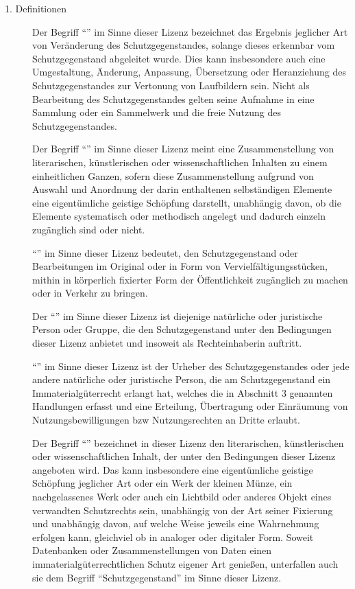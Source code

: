 \begin{description}
\item[1. Definitionen] Der Begriff
  \enquote{} im Sinne dieser Lizenz
  bezeichnet das Ergebnis jeglicher Art von Veränderung
  des Schutzgegenstandes, solange dieses erkennbar vom
  Schutzgegenstand abgeleitet wurde. Dies kann
  insbesondere auch eine Umgestaltung, Änderung,
  Anpassung, Übersetzung oder Heranziehung des
  Schutzgegenstandes zur Vertonung von Laufbildern sein.
  Nicht als Bearbeitung des Schutzgegenstandes gelten
  seine Aufnahme in eine Sammlung oder ein Sammelwerk und
  die freie Nutzung des Schutzgegenstandes.

  Der Begriff \enquote{} im Sinne dieser
  Lizenz meint eine Zusammenstellung von literarischen,
  künstlerischen oder wissenschaftlichen Inhalten zu einem
  einheitlichen Ganzen, sofern diese Zusammenstellung
  aufgrund von Auswahl und Anordnung der darin enthaltenen
  selbständigen Elemente eine eigentümliche geistige
  Schöpfung darstellt, unabhängig davon, ob die Elemente
  systematisch oder methodisch angelegt und dadurch
  einzeln zugänglich sind oder nicht.

  \enquote{} im Sinne dieser Lizenz
  bedeutet, den Schutzgegenstand oder Bearbeitungen im Original oder
  in Form von Vervielfältigungsstücken, mithin in
  körperlich fixierter Form der Öffentlichkeit zugänglich
  zu machen oder in Verkehr zu bringen.

  Der \enquote{} im Sinne dieser Lizenz
  ist diejenige natürliche oder juristische Person oder
  Gruppe, die den Schutzgegenstand unter den Bedingungen
  dieser Lizenz anbietet und insoweit als Rechteinhaberin
  auftritt.

  \enquote{} im Sinne dieser Lizenz ist
  der Urheber des Schutzgegenstandes oder jede andere
  natürliche oder juristische Person, die am
  Schutzgegenstand ein Immaterialgüterrecht erlangt hat,
  welches die in Abschnitt 3 genannten Handlungen erfasst
  und eine Erteilung, Übertragung oder Einräumung von
  Nutzungsbewilligungen bzw Nutzungsrechten an Dritte
  erlaubt.

  Der Begriff \enquote{} bezeichnet
  in dieser Lizenz den literarischen, künstlerischen oder
  wissenschaftlichen Inhalt, der unter den Bedingungen
  dieser Lizenz angeboten wird. Das kann insbesondere eine
  eigentümliche geistige Schöpfung jeglicher Art oder ein
  Werk der kleinen Münze, ein nachgelassenes Werk oder
  auch ein Lichtbild oder anderes Objekt eines verwandten
  Schutzrechts sein, unabhängig von der Art seiner
  Fixierung und unabhängig davon, auf welche Weise jeweils
  eine Wahrnehmung erfolgen kann, gleichviel ob in
  analoger oder digitaler Form. Soweit Datenbanken oder
  Zusammenstellungen von Daten einen
  immaterialgüterrechtlichen Schutz eigener Art genießen,
  unterfallen auch sie dem Begriff \enquote{Schutzgegenstand} im
  Sinne dieser Lizenz.


\end{description}
